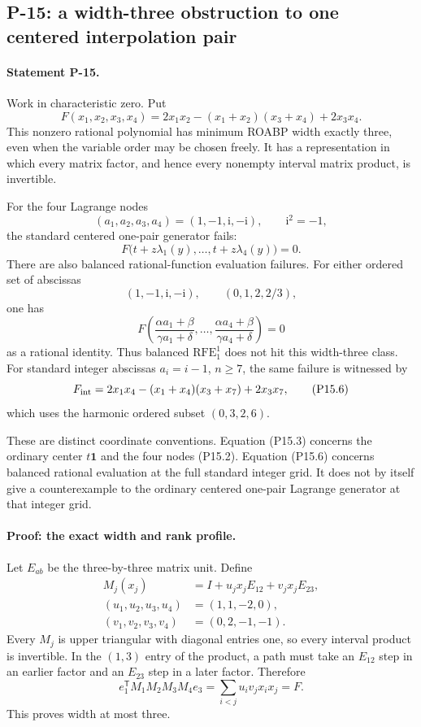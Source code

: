 \documentclass[11pt,a4paper]{article}
\theoremstyle{definition}\newtheorem{definition}{Definition}
\begin{document}
\subsection{P-15: a width-three obstruction to one centered interpolation pair}
\paragraph{Statement P-15.}
Work in characteristic zero. Put
\[
 F(x_1,x_2,x_3,x_4)
   =2x_1x_2-(x_1+x_2)(x_3+x_4)+2x_3x_4.
 \tag{P15.1}
\]
This nonzero rational polynomial has minimum ROABP width exactly
three, even when the variable order may be chosen freely. It has
a representation in which every matrix factor, and hence every
nonempty interval matrix product, is invertible.

For the four Lagrange nodes
\[
 (a_1,a_2,a_3,a_4)=(1,-1,\mathrm i,-\mathrm i),
 \qquad \mathrm i^2=-1,
 \tag{P15.2}
\]
the standard centered one-pair generator fails:
\[
 F\bigl(t+z\lambda_1(y),\ldots,t+z\lambda_4(y)\bigr)=0.
 \tag{P15.3}
\]
There are also balanced rational-function evaluation failures.
For either ordered set of abscissas
\[
 (1,-1,\mathrm i,-\mathrm i),\qquad (0,1,2,2/3),
 \tag{P15.4}
\]
one has
\[
 F\left(\frac{\alpha a_1+\beta}{\gamma a_1+\delta},
        \ldots,
        \frac{\alpha a_4+\beta}{\gamma a_4+\delta}\right)=0
 \tag{P15.5}
\]
as a rational identity. Thus balanced $\mathrm{RFE}_1^1$ does not
hit this width-three class. For standard integer abscissas
$a_i=i-1$, $n\geq7$, the same failure is witnessed by
\[
 F_{\rm int}
   =2x_1x_4-(x_1+x_4)(x_3+x_7)+2x_3x_7,
 \tag{P15.6}
\]
which uses the harmonic ordered subset $(0,3,2,6)$.

These are distinct coordinate conventions. Equation (P15.3)
concerns the ordinary center $t\mathbf1$ and the four nodes
(P15.2). Equation (P15.6) concerns balanced rational evaluation
at the full standard integer grid. It does not by itself give
a counterexample to the ordinary centered one-pair Lagrange
generator at that integer grid.

\paragraph{Proof: the exact width and rank profile.}
Let $E_{ab}$ be the three-by-three matrix unit. Define
\[
 \begin{aligned}
 M_j(x_j)&=I+u_jx_jE_{12}+v_jx_jE_{23},\\
 (u_1,u_2,u_3,u_4)&=(1,1,-2,0),\\
 (v_1,v_2,v_3,v_4)&=(0,2,-1,-1).
 \end{aligned}
 \tag{P15.7}
\]
Every $M_j$ is upper triangular with diagonal entries one,
so every interval product is invertible. In the $(1,3)$ entry
of the product, a path must take an $E_{12}$ step in an earlier
factor and an $E_{23}$ step in a later factor. Therefore
\[
 e_1^{\mathsf T}M_1M_2M_3M_4e_3
    =\sum_{i<j}u_iv_jx_ix_j=F.
 \tag{P15.8}
\]
This proves width at most three.
\end{document}
